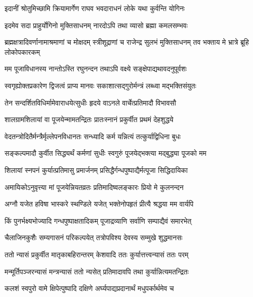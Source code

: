 \twolineshloka
{इदानीं श्रोतुमिच्छामि क्रियामार्गेण राघव}
{भवदाराधनं लोके यथा कुर्वन्ति योगिनः} %

\twolineshloka
{इदमेव सदा प्राहुर्योगिनो मुक्तिसाधनम्}
{नारदोऽपि तथा व्यासो ब्रह्मा कमलसम्भवः} %

\threelineshloka
{ब्रह्मक्षत्रादिवर्णानामाश्रमाणां च मोक्षदम्}
{स्त्रीशूद्राणां च राजेन्द्र सुलभं मुक्तिसाधनम्}
{तव भक्ताय मे भ्रात्रे ब्रूहि लोकोपकारकम्} %


\twolineshloka
{मम पूजाविधानस्य नान्तोऽस्ति रघुनन्दन}
{तथाऽपि वक्ष्ये सङ्क्षेपाद्यथावदनुपूर्वशः} %

\twolineshloka
{स्वगृह्योक्तप्रकारेण द्विजत्वं प्राप्य मानवः}
{सकाशात्सद्गुरोर्मन्त्रं लब्ध्वा मद्भक्तिसंयुतः} %

\twolineshloka
{तेन सन्दर्शितविधिर्मामेवाराधयेत्सुधीः}
{हृदये वाऽनले वार्चेत्प्रतिमादौ विभावसौ} %

\twolineshloka
{शालग्रामशिलायां वा पूजयेन्मामतन्द्रितः}
{प्रातःस्नानं प्रकुर्वीत प्रथमं देहशुद्धये} %

\twolineshloka
{वेदतन्त्रोदितैर्मन्त्रैर्मृल्लेपनविधानतः}
{सन्ध्यादि कर्म यन्नित्यं तत्कुर्याद्विधिना बुधः} %

\twolineshloka
{सङ्कल्पमादौ कुर्वीत सिद्ध्यर्थं कर्मणां सुधीः}
{स्वगुरुं पूजयेद्भक्त्या मद्बुद्ध्या पूजको मम} %

\twolineshloka
{शिलायां स्नपनं कुर्यात्प्रतिमासु प्रमार्जनम्}
{प्रसिद्धैर्गन्धपुष्पाद्यैर्मत्पूजा सिद्धिदायिका} %

\twolineshloka
{अमायिकोऽनुवृत्त्या मां पूजयेन्नियतव्रतः}
{प्रतिमादिष्वलङ्कारः प्रियो मे कुलनन्दन} %

\twolineshloka
{अग्नौ यजेत हविषा भास्करे स्थण्डिले यजेत्}
{भक्तेनोपहृतं प्रीत्यै श्रद्धया मम वार्यपि} %

\twolineshloka
{किं पुनर्भक्ष्यभोज्यादि गन्धपुष्पाक्षतादिकम्}
{पूजाद्रव्याणि सर्वाणि सम्पाद्यैवं समारभेत्} %

\twolineshloka
{चैलाजिनकुशैः सम्यगासनं परिकल्पयेत्}
{तत्रोपविश्य देवस्य सम्मुखे शुद्धमानसः} %

\twolineshloka
{ततो न्यासं प्रकुर्वीत मातृकाबहिरान्तरम्}
{केशवादि ततः कुर्यात्तत्त्वन्यासं ततः परम्} %

\twolineshloka
{मन्मूर्तिपञ्जरन्यासं मन्त्रन्यासं ततो न्यसेत्}
{प्रतिमादावपि तथा कुर्यान्नित्यमतन्द्रितः} %

\twolineshloka
{कलशं स्वपुरो वामे क्षिपेत्पुष्पादि दक्षिणे}
{अर्घ्यपाद्यप्रदानार्थं मधुपर्कार्थमेव च} %


